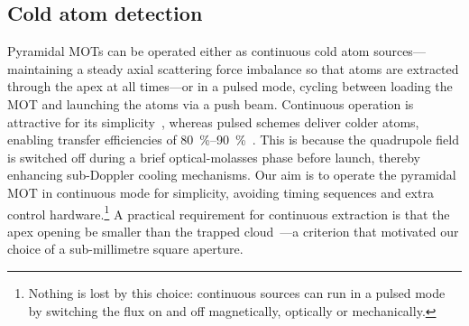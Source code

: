 \documentclass[../Thesis-IJspeert.tex]{subfiles}
\begin{document}
\subsection{Cold atom detection}
\label{pyramidMOTcoldatom}


Pyramidal MOTs can be operated either as continuous cold atom sources---maintaining a steady axial scattering force imbalance so that atoms are extracted through the apex at all times---or in a pulsed mode, cycling between loading the MOT and launching the atoms via a push beam. Continuous operation is attractive for its simplicity~\cite{Cacciapuoti2001}, whereas pulsed schemes deliver colder atoms, enabling transfer efficiencies of \SIrange{80}{90}{\percent}~\cite{Swanson1998,Myatt1996}. This is because the quadrupole field is switched off during a brief optical-molasses phase before launch, thereby enhancing sub-Doppler cooling mechanisms. Our aim is to operate the pyramidal MOT in continuous mode for simplicity, avoiding timing sequences and extra control hardware.\footnote{Nothing is lost by this choice: continuous sources can run in a pulsed mode by switching the flux on and off magnetically, optically or mechanically.} A practical requirement for continuous extraction is that the apex opening be smaller than the trapped cloud~\cite{Kim2001}---a criterion that motivated our choice of a sub-millimetre square aperture.
\end{document}
